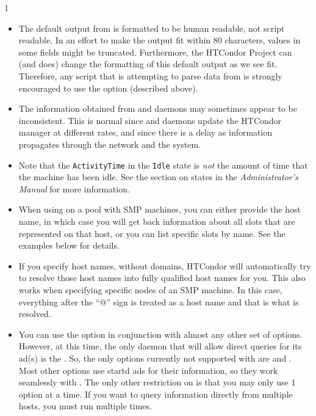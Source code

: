 \begin{ManPage}{\label{man-condor-status}}{1}
\GenRem
\begin{itemize}
	\item The default output from  is formatted to
	be human readable, not script readable.
	In an effort to make the output fit within 80 characters,
	values in some fields might be truncated.
	Furthermore, the HTCondor Project can (and does) change the
	formatting of this default output as we see fit.
	Therefore, any script that is attempting to parse data from
	 is strongly encouraged to use the
	 option (described above).

	\item The information obtained from  and 
	daemons
	may sometimes appear to be inconsistent.  This is normal since
	  and  daemons update the HTCondor
	manager at different rates, and since there is a
	delay as information propagates through the network and the system.

	\item Note that the \texttt{ActivityTime} in the \texttt{Idle} state is
	\emph{not} the amount of time that the machine has been idle.  See the
	section on  states in the \emph{Administrator's Manual}
	for more information.

	\item When using  on a pool with SMP machines,
	you can either provide the host name, in which case you will
	get back information about all slots that are represented on
	that host, or you can list specific slots by name.
	See the examples below for details.

	\item If you specify host names, without domains, HTCondor will
	automatically try to resolve those host names into fully
	qualified host names for you.
	This also works when specifying specific nodes of an SMP
	machine.
	In this case, everything after the ``@'' sign is treated as a
	host name and that is what is resolved.

	\item You can use the  option in conjunction with
	almost any other set of options.
	However, at this time, the only daemon that will allow direct
	queries for its ad(s) is the .
	So, the only options currently not supported with
	 are  and .
	Most other options use startd ads for their information, so
	they work seamlessly with .
	The only other restriction on  is that you may
	only use 1  option at a time.
	If you want to query information directly from multiple hosts,
	you must run  multiple times.


\end{itemize}
\end{ManPage}

